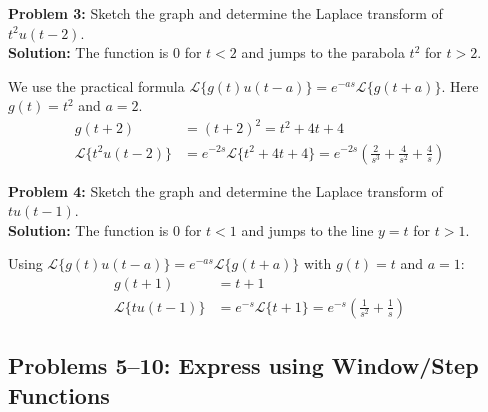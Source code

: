 \documentclass[11pt, letterpaper]{article}
\theoremstyle{definition}
\theoremstyle{remark}
\newcommand{\Lap}{\mathcal{L}}
\begin{document}
\textbf{Problem 3:} Sketch the graph and determine the Laplace transform of $t^2 u(t-2)$.
\\[4pt]
\textbf{Solution:}
The function is $0$ for $t < 2$ and jumps to the parabola $t^2$ for $t > 2$.
\begin{center}
\end{center}
We use the practical formula $\Lap\{g(t)u(t-a)\} = e^{-as}\Lap\{g(t+a)\}$. Here $g(t) = t^2$ and $a=2$.
\begin{align*}
g(t+2) &= (t+2)^2 = t^2 + 4t + 4 \\
\Lap\{t^2 u(t-2)\} &= e^{-2s} \Lap\{t^2 + 4t + 4\} = e^{-2s} \left( \frac{2}{s^3} + \frac{4}{s^2} + \frac{4}{s} \right)
\end{align*}

\textbf{Problem 4:} Sketch the graph and determine the Laplace transform of $t u(t-1)$.
\\[4pt]
\textbf{Solution:}
The function is $0$ for $t < 1$ and jumps to the line $y=t$ for $t > 1$.
\begin{center}
\end{center}
Using $\Lap\{g(t)u(t-a)\} = e^{-as}\Lap\{g(t+a)\}$ with $g(t) = t$ and $a=1$:
\begin{align*}
g(t+1) &= t + 1 \\
\Lap\{t u(t-1)\} &= e^{-s} \Lap\{t + 1\} = e^{-s} \left( \frac{1}{s^2} + \frac{1}{s} \right)
\end{align*}

\subsection{Problems 5–10: Express using Window/Step Functions}
\end{document}
